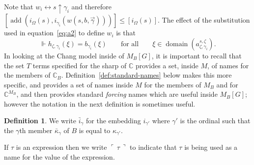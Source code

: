 \documentclass[
twoside,
]{article}
\theoremstyle{definition}
\newtheorem{definition}[theorem]{Definition}
\theoremstyle{remark}
\newcommand{\gn}[1]{\ulcorner\, #1\,\urcorner}
\newcommand{\forceKappa}{\bar\kappa} %
\DeclareMathOperator{\add}{add}
\newcommand{\scutdown}{{\uparrow}}
\newcommand{\ords}{\Omega}
\newcommand\gkeq{\leftrightarrow}
\newcommand{\forces}{\Vdash}
\DeclareMathOperator{\domain}{domain}
\newcommand\chang{\mathbb{C}}
\begin{document}
  Note that $w_i\gkeq s\scutdown\gamma_i$ and therefore
  $[\add(i_{\ords}(s), i_{\gamma_i}(w(s,b,\vec\gamma)))]\leq [i_{\ords}(s)]$.
  The effect of the substitution used  in equation~\eqref{eq:a2} to define $w_i$ is that
  \begin{equation*}
  [\add(i_{\ords}(s), i_{\gamma_i}(w_i))]\forces
  h_{\zeta,\gamma_i}(\xi)=b_{\gamma_i}(\xi)\qquad \text{for all}\qquad
  \xi\in\domain(a^{s,\zeta}_{\zeta,\gamma_i}). 
\end{equation*}
  In looking at the Chang model inside of $M_B[G]$, it is important to
  recall that the set $T$ terms specified for the sharp of $\chang$
  provides a set, inside $M$, of names for the members of $\chang_B$.   
  Definition~\ref{def:standard-names} below makes this more specific,
  and provides a set of names inside $M$ for the members of $M_B$ and
  for $\chang^{M_B}$, and then provides standard \emph{forcing} names
  which are useful inside $M_B[G]$; however the notation in the next
  definition is sometimes useful.
  \begin{definition}
    \label{def:namenotation}
    We write $\bar i_{\gamma}$ for the embedding $i_{\gamma'}$ where
    $\gamma'$ is the ordinal such that the
    $\gamma$th member $\forceKappa_{\gamma}$ of $B$ is equal to
    $\kappa_{\gamma'}$.   

    If $\tau$ is an expression then we write $\gn{\tau}$ to indicate
    that $\tau$ is being used as a name for the value of the expression.
  \end{definition}
\end{document}
